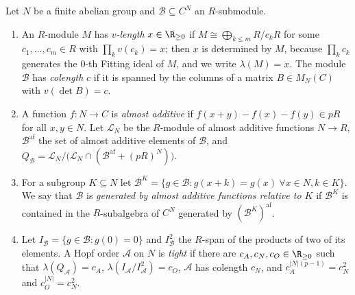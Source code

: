 \begin{definition}\label{pf:tower:def-tight}
Let $N$ be a finite abelian group and $\mathcal B\subseteq C^N$ an $R$-submodule.
\begin{enumerate}[label=(\alph*)]
\item An $R$-module $M$ has \emph{$v$-length} $x\in\R_{\ge0}$ if $M\cong\bigoplus_{k\le m}R/c_kR$ for some
  $c_1,\dots,c_m\in R$ with $\prod_kv(c_k)=x$; then $x$ is determined by $M$, because $\prod_kc_k$ generates the
  $0$-th Fitting ideal of $M$, and we write $\lambda(M)=x$. The module $\mathcal B$ has \emph{colength} $c$ if it is
  spanned by the columns of a matrix $B\in M_N(C)$ with $v(\det B)=c$.
\item A function $f\colon N\to C$ is \emph{almost additive} if $f(x+y)-f(x)-f(y)\in pR$ for all $x,y\in N$. Let
  $\mathcal L_N$ be the $R$-module of almost additive functions $N\to R$, $\mathcal B^{\mathrm{af}}$ the set of almost
  additive elements of $\mathcal B$, and
  $Q_{\mathcal B}=\mathcal L_N/\bigl(\mathcal L_N\cap(\mathcal B^{\mathrm{af}}+(pR)^N)\bigr)$.
\item For a subgroup $K\subseteq N$ let $\mathcal B^K=\{g\in\mathcal B:g(x+k)=g(x)\ \forall x\in N,k\in K\}$. We say
  that $\mathcal B$ is \emph{generated by almost additive functions relative to $K$} if $\mathcal B^K$ is contained in
  the $R$-subalgebra of $C^N$ generated by $(\mathcal B^K)^{\mathrm{af}}$.
\item Let $I_{\mathcal B}=\{g\in\mathcal B:g(0)=0\}$ and $I_{\mathcal B}^2$ the $R$-span of the products of two of its
  elements. A Hopf order $\mathcal A$ on $N$ is \emph{tight} if there are $c_A,c_N,c_O\in\R_{\ge0}$ such that
  $\lambda(Q_{\mathcal A})=c_A$, $\lambda(I_{\mathcal A}/I_{\mathcal A}^2)=c_O$, $\mathcal A$ has colength $c_N$, and
  $c_A^{|N|(p-1)}=c_N^2$ and $c_O^{|N|}=c_N^2$.
\end{enumerate}
\end{definition}

